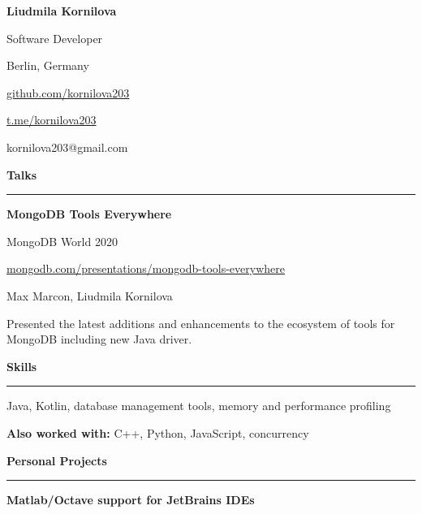 \documentclass[9pt]{article}
\begin{document}
\begin{multicols}{2}

\noindent
\vspace{3em}
\noindent

{\huge{\textbf{Liudmila Kornilova}}}

Software Developer

Berlin, Germany

\vspace{1em}

\href{https://github.com/kornilova203}{github.com/kornilova203}

\href{https://t.me/kornilova203}{t.me/kornilova203}

kornilova203@gmail.com

\vspace{5em}

{\textbf{Talks}}
\vspace{0.5em}
\hrule
\vspace{1em}

{\textbf{MongoDB Tools Everywhere}}

\color{gray} MongoDB World 2020 \color{black}

\href{https://www.mongodb.com/presentations/mongodb-tools-everywhere}{mongodb.com/presentations/mongodb-tools-everywhere}

\vspace{0.3em}

Max Marcon, Liudmila Kornilova

\vspace{0.3em}

Presented the latest additions and enhancements to the ecosystem of tools for MongoDB including new Java driver.

\vspace{2em}
{\textbf{Skills}}
\vspace{0.5em}
\hrule
\vspace{1em}

Java, Kotlin, database management tools, memory and performance profiling

\vspace{0.5em}

{\textbf{Also worked with:}} C++, Python, JavaScript, concurrency


\vspace{2em}
{\textbf{Personal Projects}}
\vspace{0.5em}
\hrule
\vspace{1em}

{\textbf{Matlab/Octave support for JetBrains IDEs}}


\end{multicols}
\end{document}
